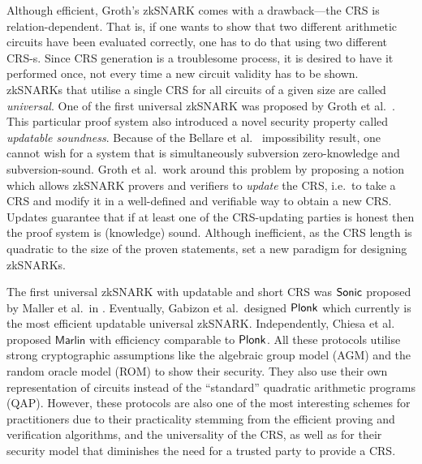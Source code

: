 \let\accentvec\vec \documentclass[runningheads]{llncs}
\begin{document}
Although efficient, Groth's zkSNARK comes with a drawback---the CRS is
relation-dependent. That is, if one wants to show that two different arithmetic
circuits have been evaluated correctly, one has to do that using two different
CRS-s.
Since CRS generation is a troublesome process, it is desired to have it
performed once, not every time a new circuit validity has to be shown. zkSNARKs
that utilise a single CRS for all circuits of a given size are called
\emph{universal}. One of the first universal zkSNARK was proposed by Groth et
al.~\cite{C:GKMMM18}. This particular proof system also introduced a novel
security property called \emph{updatable soundness}. Because of the Bellare et
al.~\cite{AC:BelFucSca16} impossibility result, one cannot wish for a system
that is simultaneously subversion zero-knowledge and subversion-sound. Groth et
al.~work around this problem by proposing a notion which allows zkSNARK provers
and verifiers to \emph{update} the CRS, i.e.~to take a CRS and modify it in a
well-defined and verifiable way to obtain a new CRS. Updates guarantee that if
at least one of the CRS-updating parties is honest then the proof system is
(knowledge) sound. Although inefficient, as the CRS length is quadratic to the
size of the proven statements, \cite{C:GKMMM18} set a new paradigm for designing
zkSNARKs.

The first universal zkSNARK with updatable and short CRS was ${\textnormal{\textsf{Sonic}}}$ proposed
by Maller et al.~in \cite{CCS:MBKM19}. Eventually, Gabizon et al.~designed
$\textnormal{\textsf{Plonk}}$ \cite{EPRINT:GabWilCio19} which currently is the most efficient
updatable universal zkSNARK. Independently, Chiesa et al.~\cite{EC:CHMMVW20}
proposed $\textsf{Marlin}$ with efficiency comparable to $\textnormal{\textsf{Plonk}}$.
%
All these protocols utilise strong cryptographic assumptions like the algebraic
group model (AGM) and the random oracle model (ROM) to show their security. They
also use their own representation of circuits instead of the ``standard''
quadratic arithmetic programs (QAP). However, these protocols are also one of
the most interesting schemes for practitioners due to their practicality
stemming from the efficient proving and verification algorithms, and the
universality of the CRS, as well as for their security model that diminishes the
need for a trusted party to provide a CRS.

\end{document}
